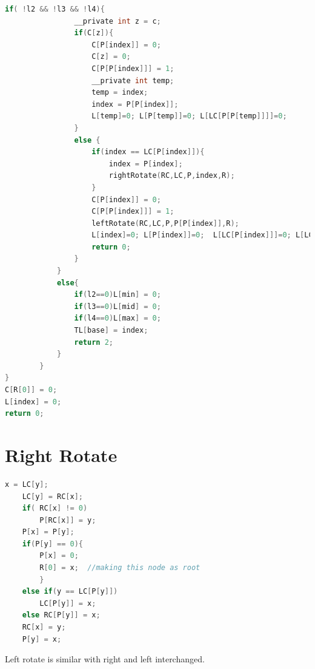 \documentclass[BTech]{iitmdiss}
\begin{document}
\begin{lstlisting}[language=C]
			if( !l2 && !l3 && !l4){
				__private int z = c;
				if(C[z]){
					C[P[index]] = 0;
					C[z] = 0;
					C[P[P[index]]] = 1;
					__private int temp;
					temp = index;
					index = P[P[index]];
					L[temp]=0; L[P[temp]]=0; L[LC[P[P[temp]]]]=0;
				}
				else {
					if(index == LC[P[index]]){
						index = P[index];
						rightRotate(RC,LC,P,index,R);
					}
					C[P[index]] = 0;
					C[P[P[index]]] = 1;
					leftRotate(RC,LC,P,P[P[index]],R);
					L[index]=0; L[P[index]]=0;  L[LC[P[index]]]=0; L[LC[LC[P[index]]]]=0;
					return 0;
				}
			}
			else{
				if(l2==0)L[min] = 0;
				if(l3==0)L[mid] = 0;
				if(l4==0)L[max] = 0; 
				TL[base] = index;
				return 2;
			}
		}	
}
C[R[0]] = 0;
L[index] = 0;
return 0;
\end{lstlisting}

\chapter{Right Rotate}
\lstset{style=mystyle}
 \begin{lstlisting}[language=C]
 x = LC[y];
	LC[y] = RC[x];
	if( RC[x] != 0)
		P[RC[x]] = y;
	P[x] = P[y];
	if(P[y] == 0){
		P[x] = 0;
		R[0] = x;  //making this node as root
		}
	else if(y == LC[P[y]])
		LC[P[y]] = x;
	else RC[P[y]] = x;
	RC[x] = y;
	P[y] = x;
 \end{lstlisting}
Left rotate is similar with right and left interchanged.
\end{document}
